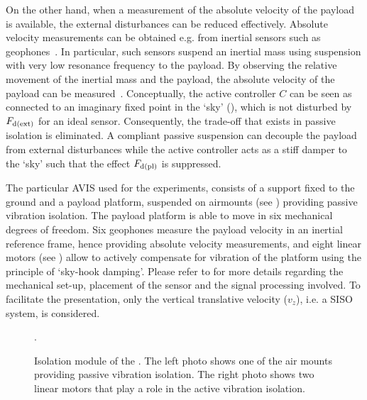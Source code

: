 On the other hand, when a measurement of the absolute velocity of the payload is available, the external disturbances can be reduced effectively.
Absolute velocity measurements can be obtained e.g. from inertial sensors such as geophones~\citep{MunnigSchmidt2014}.
In particular, such sensors suspend an inertial mass using suspension with very low resonance frequency to the payload.
By observing the relative movement of the inertial mass and the payload, the absolute velocity of the payload can be measured~\citep{Collette2011}.
Conceptually, the active controller $C$ can be seen as connected to an imaginary fixed point in the `sky' (), which is not disturbed by $F_{\mathrm{d(ext)}}$ for an ideal sensor.
Consequently, the trade-off that exists in passive isolation is eliminated.
A compliant passive suspension can decouple the payload from external disturbances while the active controller acts as a stiff damper to the `sky' such that the effect $F_{\mathrm{d(pl)}}$ is suppressed.

The particular \gls{AVIS} used for the experiments, consists of a support fixed to the ground and a payload platform, suspended on airmounts (see ) providing passive vibration isolation.
The payload platform is able to move in six mechanical degrees of freedom.
Six geophones measure the payload velocity in an inertial reference frame, hence providing absolute velocity measurements, and eight linear motors (see ) allow to actively compensate for vibration of the platform using the principle of `sky-hook damping'.
Please refer to  for more details regarding the mechanical set-up, placement of the sensor and the signal processing involved.
To facilitate the presentation, only the vertical translative velocity ($v_z$), i.e. a \gls{SISO} system, is considered.

\begin{figure}[p]
  \centering
  \setlength{}
  \caption{.}
  \label{fig:lrmhinf:avis}
\end{figure}

\begin{figure}[p]
  \centering
  \setlength{\figurewidth}{0.475\columnwidth}
  \hfill
  \caption[ isolation module.]{Isolation module of the . 
  The left photo shows one of the air mounts providing passive vibration isolation.
  The right photo shows two linear motors that play a role in the active vibration isolation.}
  \label{fig:lrmhinf:avis:details}
\end{figure}

